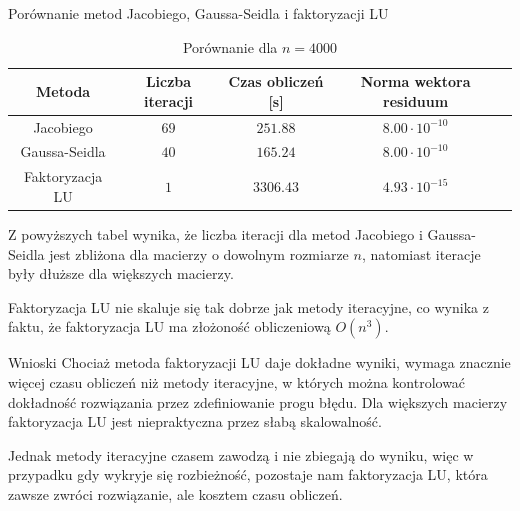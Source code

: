 \documentclass{article}
\begin{document}
\begin{section}{Porównanie metod Jacobiego, Gaussa-Seidla i faktoryzacji LU}
    \begin{table}
        \centering
        \begin{tabular}{|c|c|c|c|c|}
            \hline
            Metoda & Liczba iteracji & Czas obliczeń [s] & Norma wektora residuum \\
            \hline
            Jacobiego & $69$ & $251.88$ & $8.00\cdot10^{-10}$ \\
            Gaussa-Seidla & $40$ & $165.24$ & $8.00\cdot10^{-10}$ \\
            Faktoryzacja LU & $1$ & $3306.43$ & $4.93\cdot10^{-15}$ \\
            \hline
        \end{tabular}
        \caption{Porównanie dla $n = 4000$}
    \end{table}

    Z powyższych tabel wynika, że liczba iteracji dla metod Jacobiego i Gaussa-Seidla jest zbliżona dla
    macierzy o dowolnym rozmiarze $n$, natomiast iteracje były dłuższe dla większych macierzy.

    Faktoryzacja LU nie skaluje się tak dobrze jak metody iteracyjne, co wynika z faktu, że faktoryzacja LU
    ma złożoność obliczeniową $O(n^3)$. 
\end{section}

\begin{section}{Wnioski}
    Chociaż metoda faktoryzacji LU daje dokładne wyniki, wymaga znacznie więcej czasu obliczeń niż metody iteracyjne,
    w których można kontrolować dokładność rozwiązania przez zdefiniowanie progu błędu. Dla większych macierzy
    faktoryzacja LU jest niepraktyczna przez słabą skalowalność. 

    Jednak metody iteracyjne czasem zawodzą i nie zbiegają do wyniku, więc w przypadku gdy wykryje się rozbieżność,
    pozostaje nam faktoryzacja LU, która zawsze zwróci rozwiązanie, ale kosztem czasu obliczeń.
\end{section}

\printbibliography
\end{document}
